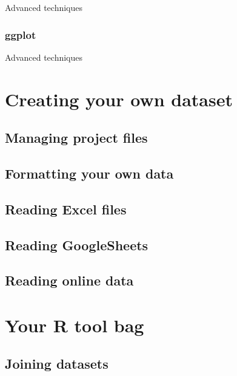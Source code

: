 \documentclass[
]{book}
\begin{document}
Advanced techniques

\hypertarget{ggplot}{%
\section{ggplot}\label{ggplot}}

Advanced techniques

\hypertarget{part-creating-your-own-dataset}{%
\part{Creating your own dataset}\label{part-creating-your-own-dataset}}

\hypertarget{managing-project-files}{%
\chapter{Managing project files}\label{managing-project-files}}

\hypertarget{formatting-your-own-data}{%
\chapter{Formatting your own data}\label{formatting-your-own-data}}

\hypertarget{reading-excel-files}{%
\chapter{Reading Excel files}\label{reading-excel-files}}

\hypertarget{reading-googlesheets}{%
\chapter{Reading GoogleSheets}\label{reading-googlesheets}}

\hypertarget{reading-online-data}{%
\chapter{Reading online data}\label{reading-online-data}}

\hypertarget{part-your-r-tool-bag}{%
\part{Your R tool bag}\label{part-your-r-tool-bag}}

\hypertarget{joining-datasets}{%
\chapter{Joining datasets}\label{joining-datasets}}
\end{document}
